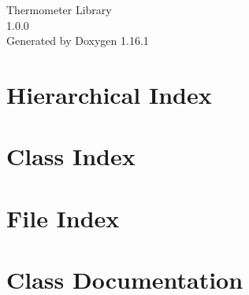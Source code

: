 \documentclass[twoside]{book}
\newcommand{\+}{\discretionary{\mbox{\scriptsize$\hookleftarrow$}}{}{}}
\newcommand{\clearemptydoublepage}{%
    \newpage{\pagestyle{empty}\cleardoublepage}%
  }
\begin{document}
  \raggedbottom
    \hypersetup{pageanchor=false,
                bookmarksnumbered=true,
                pdfencoding=unicode
               }
  \begin{titlepage}
  \vspace*{7cm}
  \begin{center}%
  {\Large Thermometer Library}\\
  [1ex]\large 1.\+0.\+0 \\
  \vspace*{1cm}
  {\large Generated by Doxygen 1.16.1}\\
  \end{center}
  \end{titlepage}
  \clearemptydoublepage
  \tableofcontents
  \clearemptydoublepage
  \hypersetup{pageanchor=true}

\chapter{Hierarchical Index}

\chapter{Class Index}

\chapter{File Index}

\chapter{Class Documentation}








\end{document}
